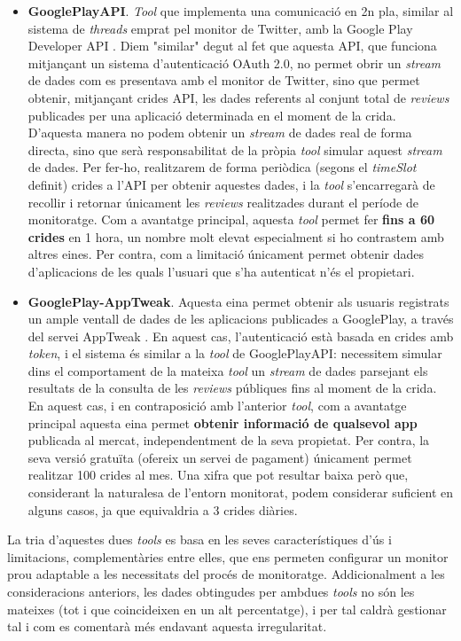 \begin{itemize}
\item \textbf{GooglePlayAPI}. \textit{Tool} que implementa una comunicació en 2n pla, similar al sistema de \textit{threads} emprat pel monitor de Twitter, amb la Google Play Developer API \cite{googleplay}. Diem "similar" degut al fet que aquesta API, que funciona mitjançant un sistema d'autenticació OAuth 2.0, no permet obrir un \textit{stream} de dades com es presentava amb el monitor de Twitter, sino que permet obtenir, mitjançant crides API, les dades referents al conjunt total de \textit{reviews} publicades per una aplicació determinada en el moment de la crida. D'aquesta manera no podem obtenir un \textit{stream} de dades real de forma directa, sino que serà responsabilitat de la pròpia \textit{tool} simular aquest \textit{stream} de dades. Per fer-ho, realitzarem de forma periòdica (segons el \textit{timeSlot} definit) crides a l'API per obtenir aquestes dades, i la \textit{tool} s'encarregarà de recollir i retornar únicament les \textit{reviews} realitzades durant el període de monitoratge. Com a avantatge principal, aquesta \textit{tool} permet fer \textbf{fins a 60 crides} en 1 hora, un nombre molt elevat especialment si ho contrastem amb altres eines. Per contra, com a limitació únicament permet obtenir dades d'aplicacions de les quals l'usuari que s'ha autenticat n'és el propietari.
\item \textbf{GooglePlay-AppTweak}. Aquesta eina permet obtenir als usuaris registrats un ample ventall de dades de les aplicacions publicades a GooglePlay, a través del servei AppTweak \cite{apptweak}. En aquest cas, l'autenticació està basada en crides amb \textit{token}, i el sistema és similar a la \textit{tool} de GooglePlayAPI: necessitem simular dins el comportament de la mateixa \textit{tool} un \textit{stream} de dades parsejant els resultats de la consulta de les \textit{reviews} públiques fins al moment de la crida. En aquest cas, i en contraposició amb l'anterior \textit{tool}, com a avantatge principal aquesta eina permet \textbf{obtenir informació de qualsevol app} publicada al mercat, independentment de la seva propietat. Per contra, la seva versió gratuïta (ofereix un servei de pagament) únicament permet realitzar 100 crides al mes. Una xifra que pot resultar baixa però que, considerant la naturalesa de l'entorn monitorat, podem considerar suficient en alguns casos, ja que equivaldria a 3 crides diàries. 
\end{itemize}

La tria d'aquestes dues \textit{tools} es basa en les seves característiques d'ús i limitacions, complementàries entre elles, que ens permeten configurar un monitor prou adaptable a les necessitats del procés de monitoratge. Addicionalment a les consideracions anteriors, les dades obtingudes per ambdues \textit{tools} no són les mateixes (tot i que coincideixen en un alt percentatge), i per tal caldrà gestionar tal i com es comentarà més endavant aquesta irregularitat.\\

